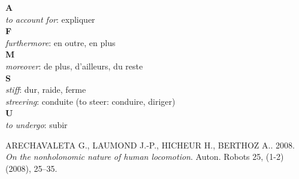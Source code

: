 \documentclass[11pt]{article}
\begin{document}
\noindent \textbf{A}\\
\textit{to account for}: expliquer\\
\textbf{F}\\
\textit{furthermore}: en outre, en plus\\
\textbf{M}\\
\textit{moreover}: de plus, d'ailleurs, du reste\\
\textbf{S}\\
\textit{stiff}: dur, raide, ferme\\
\textit{streering}: conduite (to steer: conduire, diriger)\\
\textbf{U}\\
\textit{to undergo}: subir\\

\begin{thebibliography}{2} 

\label{ARECHAVALETA-08}
ARECHAVALETA G., LAUMOND J.-P., HICHEUR H., BERTHOZ A.. 2008.
\textit{On the nonholonomic nature of human locomotion}. Auton. Robots 25, (1-2) (2008), 25–35.

\end{thebibliography}
\end{document}
